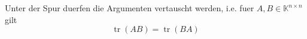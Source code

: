 Unter der Spur duerfen die Argumenten vertauscht werden, i.e. fuer $A,B \in\mathbb{K}^{n \times n}$ gilt
$$\operatorname{tr}(A B) = \operatorname{tr}(B A)$$ 
